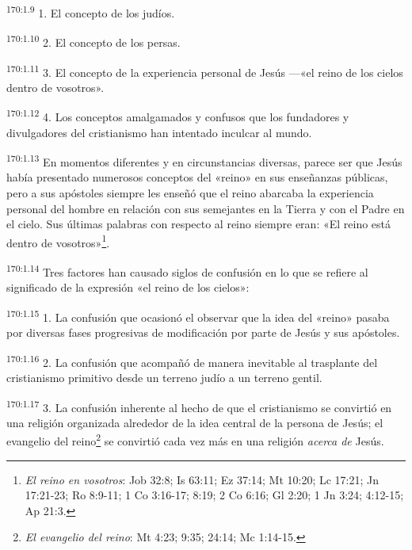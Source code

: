 \par 
\textsuperscript{170:1.9} 1. El concepto de los judíos.

\par 
\textsuperscript{170:1.10} 2. El concepto de los persas.

\par 
\textsuperscript{170:1.11} 3. El concepto de la experiencia personal de Jesús ---«el reino de los cielos dentro de vosotros».

\par 
\textsuperscript{170:1.12} 4. Los conceptos amalgamados y confusos que los fundadores y divulgadores del cristianismo han intentado inculcar al mundo.

\par 
\textsuperscript{170:1.13} En momentos diferentes y en circunstancias diversas, parece ser que Jesús había presentado numerosos conceptos del «reino» en sus enseñanzas públicas, pero a sus apóstoles siempre les enseñó que el reino abarcaba la experiencia personal del hombre en relación con sus semejantes en la Tierra y con el Padre en el cielo. Sus últimas palabras con respecto al reino siempre eran: «El reino está dentro de vosotros»\footnote{\textit{El reino en vosotros}: Job 32:8; Is 63:11; Ez 37:14; Mt 10:20; Lc 17:21; Jn 17:21-23; Ro 8:9-11; 1 Co 3:16-17; 8:19; 2 Co 6:16; Gl 2:20; 1 Jn 3:24; 4:12-15; Ap 21:3.}.

\par 
\textsuperscript{170:1.14} Tres factores han causado siglos de confusión en lo que se refiere al significado de la expresión «el reino de los cielos»:

\par 
\textsuperscript{170:1.15} 1. La confusión que ocasionó el observar que la idea del «reino» pasaba por diversas fases progresivas de modificación por parte de Jesús y sus apóstoles.

\par 
\textsuperscript{170:1.16} 2. La confusión que acompañó de manera inevitable al trasplante del cristianismo primitivo desde un terreno judío a un terreno gentil.

\par 
\textsuperscript{170:1.17} 3. La confusión inherente al hecho de que el cristianismo se convirtió en una religión organizada alrededor de la idea central de la persona de Jesús; el evangelio del reino\footnote{\textit{El evangelio del reino}: Mt 4:23; 9:35; 24:14; Mc 1:14-15.} se convirtió cada vez más en una religión \textit{acerca de} Jesús.

